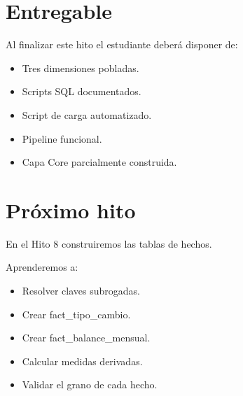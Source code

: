 \section{Entregable}

Al finalizar este hito el estudiante deberá disponer de:

\begin{itemize}
\item Tres dimensiones pobladas.
\item Scripts SQL documentados.
\item Script de carga automatizado.
\item Pipeline funcional.
\item Capa Core parcialmente construida.
\end{itemize}

\section{Próximo hito}

En el Hito 8 construiremos las tablas de hechos.

Aprenderemos a:

\begin{itemize}
\item Resolver claves subrogadas.
\item Crear fact_tipo_cambio.
\item Crear fact_balance_mensual.
\item Calcular medidas derivadas.
\item Validar el grano de cada hecho.
\end{itemize}

